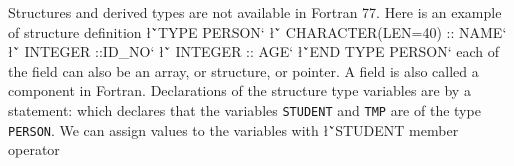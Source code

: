 {

Structures and derived types are not available in Fortran 77.
Here is an example of structure definition
\sms
\vbox{\l{\v`TYPE PERSON`}
\l{\v`   CHARACTER(LEN=40) :: NAME`}
\l{\v`   INTEGER ::ID_NO`}
\l{\v`   INTEGER :: AGE`}
\l{\v`END TYPE PERSON`}}
\sms
each of the field can also be an array, or structure, or pointer.  
A field is also called a component in Fortran.
Declarations of the structure type variables are by a statement:
\sms
{}
\sms
which declares that the variables {\tt STUDENT} and {\tt TMP} are of
the type {\tt PERSON}.  We can assign values to the variables with
\sms
\l{\v`STUDENT%
				   member operator}}
